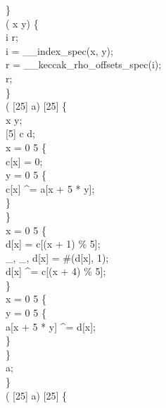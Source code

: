 \}\\
  (  x y) \jasminarrow{}   \{\\
  i r;\\
i = __index_spec(x, y);\\
r = __keccak_rho_offsets_spec(i);\\
 r;\\
\}\\
  ( [25] a) \jasminarrow{}  [25] \{\\
  x y;\\
 [5] c d;\\
 x = 0  5 \{\\
c[x] = 0;\\
 y = 0  5 \{\\
c[x] \textasciicircum{}= a[x + 5 * y];\\
\}\\
\}\\
 x = 0  5 \{\\
d[x] = c[(x + 1) \% 5];\\
_, _, d[x] = \#(d[x], 1);\\
d[x] \textasciicircum{}= c[(x + 4) \% 5];\\
\}\\
 x = 0  5 \{\\
 y = 0  5 \{\\
a[x + 5 * y] \textasciicircum{}= d[x];\\
\}\\
\}\\
 a;\\
\}\\
  ( [25] a) \jasminarrow{}  [25] \{\\
